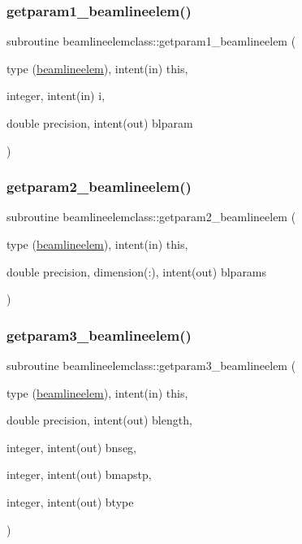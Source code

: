 \subsubsection{\texorpdfstring{getparam1\_beamlineelem()}{getparam1\_beamlineelem()}}
{\footnotesize\ttfamily subroutine beamlineelemclass\+::getparam1\+\_\+beamlineelem (\begin{DoxyParamCaption}\item[{type (\mbox{\hyperlink{namespacebeamlineelemclass_structbeamlineelemclass_1_1beamlineelem}{beamlineelem}}), intent(in)}]{this,  }\item[{integer, intent(in)}]{i,  }\item[{double precision, intent(out)}]{blparam }\end{DoxyParamCaption})}

\mbox{\label{namespacebeamlineelemclass_ab0803e0260eb5f57a59a7d1f70cf7050}} 
\subsubsection{\texorpdfstring{getparam2\_beamlineelem()}{getparam2\_beamlineelem()}}
{\footnotesize\ttfamily subroutine beamlineelemclass\+::getparam2\+\_\+beamlineelem (\begin{DoxyParamCaption}\item[{type (\mbox{\hyperlink{namespacebeamlineelemclass_structbeamlineelemclass_1_1beamlineelem}{beamlineelem}}), intent(in)}]{this,  }\item[{double precision, dimension(\+:), intent(out)}]{blparams }\end{DoxyParamCaption})}

\mbox{\label{namespacebeamlineelemclass_a0b69da010861c6ca72da3822335a7b2f}} 
\subsubsection{\texorpdfstring{getparam3\_beamlineelem()}{getparam3\_beamlineelem()}}
{\footnotesize\ttfamily subroutine beamlineelemclass\+::getparam3\+\_\+beamlineelem (\begin{DoxyParamCaption}\item[{type (\mbox{\hyperlink{namespacebeamlineelemclass_structbeamlineelemclass_1_1beamlineelem}{beamlineelem}}), intent(in)}]{this,  }\item[{double precision, intent(out)}]{blength,  }\item[{integer, intent(out)}]{bnseg,  }\item[{integer, intent(out)}]{bmapstp,  }\item[{integer, intent(out)}]{btype }\end{DoxyParamCaption})}

